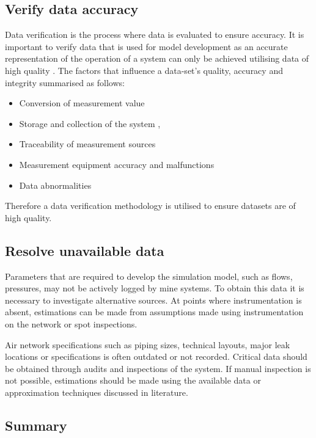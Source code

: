 	\subsection{Verify data accuracy}
	Data verification is the process where data is evaluated to ensure accuracy. It is important to verify data that is used for model development as an accurate representation of the operation of a system can only be achieved utilising data of high quality \cite{gous2016data}. The factors that influence a data-set's quality, accuracy and integrity  summarised as follows:
	\begin{itemize}
		\item Conversion of measurement value \cite{meijsen2015verification}
		\item Storage and collection of the system \cite{vanNiekerk2016quantification},\cite{Jansevan2016structuring}
		\item Traceability of measurement sources \cite{Jansevan2016structuring}
		\item Measurement equipment accuracy and malfunctions \cite{gous2016data}
		\item Data abnormalities \cite{gous2016data}
	\end{itemize} 
	\par 
	Therefore a data verification methodology is utilised to ensure datasets are of high quality. 
	\subsection{Resolve unavailable data}
		Parameters that are required to develop the simulation model, such as flows, pressures, may not be actively logged by mine systems. To obtain this data it is necessary to investigate alternative sources. At points where instrumentation is absent, estimations can be made from assumptions made using instrumentation on the network or spot inspections.
		\par 
		Air network specifications such as piping sizes, technical layouts, major leak locations or specifications is often outdated or not recorded. Critical data should be obtained through audits and inspections of the system. If manual inspection is not possible, estimations should be made using the available data or approximation techniques discussed in literature. %
	
	\subsection{Summary}	
